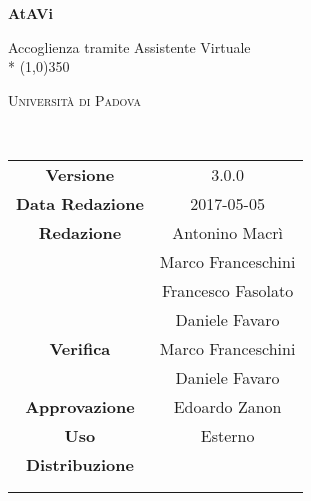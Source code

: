 \documentclass[a4paper,12pt]{article}
\author{}
\date{2017-05-05}
\begin{document}
	\begin{titlepage}
		\centering
		{\huge\bfseries AtAVi\par}
		Accoglienza tramite Assistente Virtuale \\*
		\line(1,0){350} \\
		{\scshape\LARGE Università di Padova \par}
		\vspace{1cm}
		{\scshape\Large {}\ \par}
		\logo
		\newpage
		\begin{tabular}{c|c}
			{\hfill \textbf{Versione}} 			& 3.0.0			\\ 
			{\hfill\textbf{Data Redazione}} 	& 2017-05-05 		\\ 
			{\hfill\textbf{Redazione}} 			& Antonino Macrì \\ & Marco Franceschini \\ & Francesco Fasolato\\  & Daniele Favaro \\
			{\hfill\textbf{Verifica}} 			& Marco Franceschini \\ & Daniele Favaro \\  
			{\hfill\textbf{Approvazione}} 		& Edoardo Zanon			\\
			{\hfill\textbf{Uso}} 				& Esterno 			\\
			{\hfill\textbf{Distribuzione}} 		& \vardanega \\ & \cardin \\ & \prop \\
		\end{tabular}
	\end{titlepage}
	
	\pagestyle{myfront}
	\newpage	
			

	\newpage
		\tableofcontents 	%
	\newpage
		\listoftables 		%
	\newpage	
		\listoffigures		%
	
	\label{LastFrontPage}
		\newpage
		\pagestyle{mymain}
			
		\newpage
			
		\newpage
			
		\newpage
			
		\newpage
			
		\newpage
			

	\label{LastPage}
\end{document}
